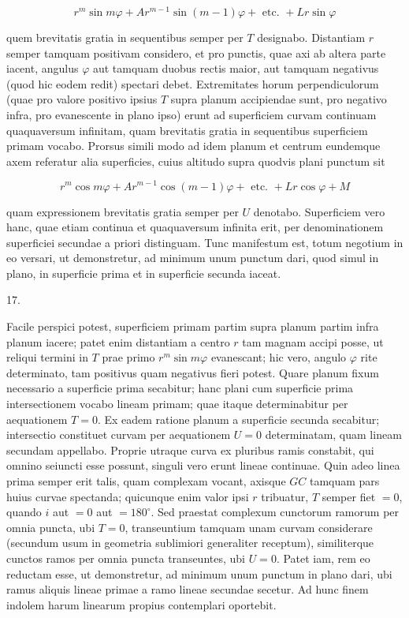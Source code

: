 \documentclass[twoside,12pt, showframe]{memoir}
\begin{document}
\[
r^{m} \sin m \varphi+A r^{m-1} \sin (m-1) \varphi+\text { etc. }+L r \sin \varphi
\]

quem brevitatis gratia in sequentibus semper per \(T\) designabo. Distantiam \(r\) semper tamquam positivam considero, et pro punctis, quae axi ab altera parte iacent, angulus \(\varphi\) aut tamquam duobus rectis maior, aut tamquam negativus (quod hic eodem redit) spectari debet. Extremitates horum perpendiculorum (quae pro valore positivo ipsius \(T\) supra planum accipiendae sunt, pro negativo infra, pro evanescente in plano ipso) erunt ad superficiem curvam continuam quaquaversum infinitam, quam brevitatis gratia in sequentibus superficiem primam vocabo. Prorsus simili modo ad idem planum et centrum eundemque axem referatur alia superficies, cuius altitudo supra quodvis plani punctum sit

\[
r^{m} \cos m \varphi+A r^{m-1} \cos (m-1) \varphi+\text { etc. }+L r \cos \varphi+M
\]

quam expressionem brevitatis gratia semper per \(U\) denotabo. Superficiem vero hanc, quae etiam continua et quaquaversum infinita erit, per denominationem
superficiei secundae a priori distinguam. Tunc manifestum est, totum negotium in eo versari, ut demonstretur, ad minimum unum punctum dari, quod simul in plano, in superficie prima et in superficie secunda iaceat.

17.

Facile perspici potest, superficiem primam partim supra planum partim infra planum iacere; patet enim distantiam a centro \(r\) tam magnam accipi posse, ut reliqui termini in \(T\) prae primo \(r^{m} \sin m \varphi\) evanescant; hic vero, angulo \(\varphi\) rite determinato, tam positivus quam negativus fieri potest. Quare planum fixum necessario a superficie prima secabitur; hanc plani cum superficie prima intersectionem vocabo lineam primam; quae itaque determinabitur per aequationem \(T=0\). Ex eadem ratione planum a superficie secunda secabitur; intersectio constituet curvam per aequationem \(U=0\) determinatam, quam lineam secundam appellabo. Proprie utraque curva ex pluribus ramis constabit, qui omnino seiuncti esse possunt, singuli vero erunt lineae continuae. Quin adeo linea prima semper erit talis, quam complexam vocant, axisque \(G C\) tamquam pars huius curvae spectanda; quicunque enim valor ipsi \(r\) tribuatur, \(T\) semper fiet \(=0\), quando \(i\) aut \(=0\) aut \(=180^{\circ}\). Sed praestat complexum cunctorum ramorum per omnia puncta, ubi \(T=0\), transeuntium tamquam unam curvam considerare (secundum usum in geometria sublimiori generaliter receptum), similiterque cunctos ramos per omnia puncta transeuntes, ubi \(U=0\). Patet iam, rem eo reductam esse, ut demonstretur, ad minimum unum punctum in plano dari, ubi ramus aliquis lineae primae a ramo lineae secundae secetur. Ad hunc finem indolem harum linearum propius contemplari oportebit.
\end{document}

